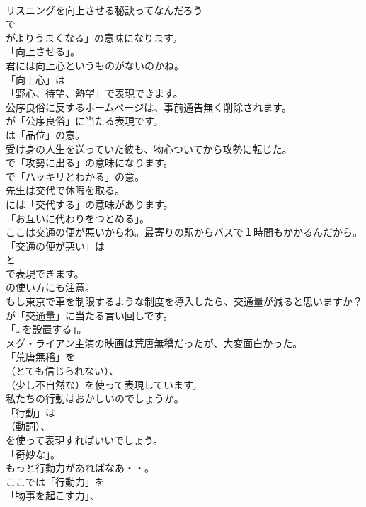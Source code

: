 \documentclass[8pt]{extreport}
\begin{document}
\begin{CJK}{UTF8}{min}
\\	リスニングを向上させる秘訣ってなんだろう 
\\	で
\\	がよりうまくなる」の意味になります。
\\	「向上させる」。	
\\	君には向上心というものがないのかね。 
\\	「向上心」は
\\	「野心、待望、熱望」で表現できます。	
\\	公序良俗に反するホームページは、事前通告無く削除されます。 
\\	が「公序良俗」に当たる表現です。
\\	は「品位」の意。	
\\	受け身の人生を送っていた彼も、物心ついてから攻勢に転じた。 
\\	で「攻勢に出る」の意味になります。
\\	で「ハッキリとわかる」の意。	
\\	先生は交代で休暇を取る。 
\\	には「交代する」の意味があります。
\\	「お互いに代わりをつとめる」。	
\\	ここは交通の便が悪いからね。最寄りの駅からバスで１時間もかかるんだから。 
\\	「交通の便が悪い」は
\\	と
\\	で表現できます。
\\	の使い方にも注意。	
\\	もし東京で車を制限するような制度を導入したら、交通量が減ると思いますか？ 
\\	が「交通量」に当たる言い回しです。
\\	「…を設置する」。	
\\	メグ・ライアン主演の映画は荒唐無稽だったが、大変面白かった。 
\\	「荒唐無稽」を 
\\	（とても信じられない）、
\\	（少し不自然な）を使って表現しています。	
\\	私たちの行動はおかしいのでしょうか。 
\\	「行動」は
\\	（動詞）、
\\	を使って表現すればいいでしょう。
\\	「奇妙な」。	
\\	もっと行動力があればなあ・・。 
\\	ここでは「行動力」を
\\	「物事を起こす力」、

\end{CJK}
\end{document}
